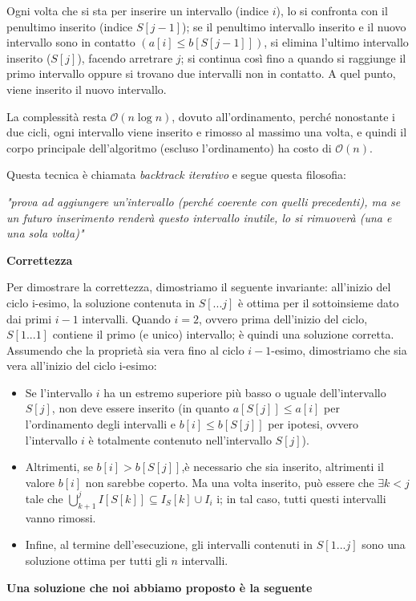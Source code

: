 \documentclass[../cheatSheetAlgoritmi.tex]{subfiles}
\begin{document}
Ogni volta che si sta per inserire un intervallo (indice $i$), lo si confronta con il penultimo inserito (indice $S[j -1]$); se il penultimo intervallo inserito e il nuovo intervallo sono in contatto $(a[i] \leq b[S[j -1]])$, si elimina l'ultimo intervallo inserito ($S[j]$), facendo arretrare $j$; si continua così fino a quando si raggiunge il primo intervallo oppure si trovano due intervalli non in contatto. A quel punto, viene inserito il nuovo intervallo. 

La complessità resta $\mathcal{O}(n \log n)$, dovuto all'ordinamento, perché nonostante i due cicli, ogni intervallo viene inserito e rimosso al massimo una volta, e quindi il corpo principale dell'algoritmo (escluso l'ordinamento) ha costo di $\mathcal{O}(n)$. 

Questa tecnica è chiamata \emph{backtrack iterativo} e segue questa filosofia: 

\emph{"prova ad aggiungere un'intervallo (perché coerente con quelli precedenti), ma se un futuro inserimento renderà questo intervallo inutile, lo si rimuoverà (una e una sola volta)"} 

\textbf{Correttezza} 

Per dimostrare la correttezza, dimostriamo il seguente invariante: all'inizio del ciclo i-esimo, la soluzione contenuta in $S[...j]$ è ottima per il sottoinsieme dato dai primi $i - 1$ intervalli. Quando $i = 2$, ovvero prima dell’inizio del ciclo, $S[1...1]$ contiene il primo (e unico) intervallo; è quindi una soluzione corretta. Assumendo che la proprietà sia vera fino al ciclo $i - 1$-esimo, dimostriamo che sia vera all'inizio del ciclo i-esimo:
\begin{itemize}
	\item Se l'intervallo $i$ ha un estremo superiore più basso o uguale dell'intervallo $S[j]$, non deve essere inserito (in quanto $a[S[j]] \leq a[i]$ per l'ordinamento degli intervalli e $b[i] \leq b[S[j]]$ per ipotesi, ovvero l'intervallo $i$ è totalmente contenuto nell'intervallo $S[j]$).
	\item Altrimenti, se $b[i]> b[S[j]]$,è necessario che sia inserito, altrimenti il valore $b[i]$ non sarebbe coperto. Ma una volta inserito, può essere che $\exists k < j$ tale che $\bigcup^{j}_{k+1} I[S[k]] \subseteq I_S[k] \cup I_i$ i; in tal caso, tutti questi intervalli vanno rimossi.
	\item Infine, al termine dell'esecuzione, gli intervalli contenuti in $S[1. . . j]$ sono una soluzione ottima per tutti gli $n$ intervalli.
\end{itemize}
\textbf{Una soluzione che noi abbiamo proposto è la seguente} 
\end{document}
